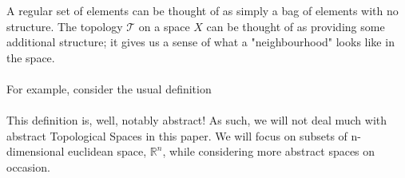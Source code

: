 \documentclass{article}
\begin{document}
A regular set of elements can be thought of as simply a bag of elements with no structure. The topology $\mathcal{T}$ on a space $X$ can be thought of as providing some additional structure; it gives us a sense of what a "neighbourhood" looks like in the space.
\\
\\
For example, consider the usual definition 
\\
\\
This definition is, well, notably abstract! As such, we will not deal much with abstract Topological Spaces in this paper. We will focus on subsets of n-dimensional euclidean space, $\mathbb{R}^n$, while considering more abstract spaces on occasion.
\end{document}
